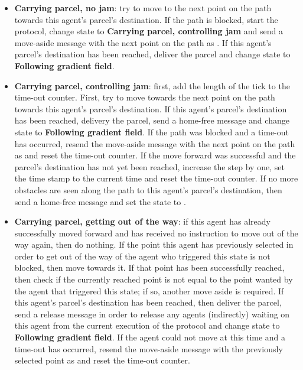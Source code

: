 \begin{itemize}
    \item \textbf{Carrying parcel, no jam}: try to move to the next point on the path towards this agent's parcel's destination. If the path is blocked, start the protocol, change state to \textbf{Carrying parcel, controlling jam} and send a move-aside message with the next point on the path as . If this agent's parcel's destination has been reached, deliver the parcel and change state to \textbf{Following gradient field}.
    \item \textbf{Carrying parcel, controlling jam}: first, add the length of the tick to the time-out counter. First, try to move towards the next point on the path towards this agent's parcel's destination. If this agent's parcel's destination has been reached, delivery the parcel, send a home-free message and change state to \textbf{Following gradient field}. If the path was blocked and a time-out has occurred, resend the move-aside message with the next point on the path as  and reset the time-out counter. If the move forward was successful and the parcel's destination has not yet been reached, increase the step by one, set the time stamp to the current time and reset the time-out counter. If no more obstacles are seen along the path to this agent's parcel's destination, then send a home-free message and set the state to .
    \item \textbf{Carrying parcel, getting out of the way}: if this agent has already successfully moved forward and has received no instruction to move out of the way again, then do nothing. If the point this agent has previously selected in order to get out of the way of the agent who triggered this state is not blocked, then move towards it. If that point has been successfully reached, then check if the currently reached point is not equal to the point wanted by the agent that triggered this state; if so, another move aside is required. If this agent's parcel's destination has been reached, then deliver the parcel, send a release message in order to release any agents (indirectly) waiting on this agent from the current execution of the protocol and change state to \textbf{Following gradient field}. If the agent could not move at this time and a time-out has occurred, resend the move-aside message with the previously selected point as  and reset the time-out counter.

\end{itemize}
